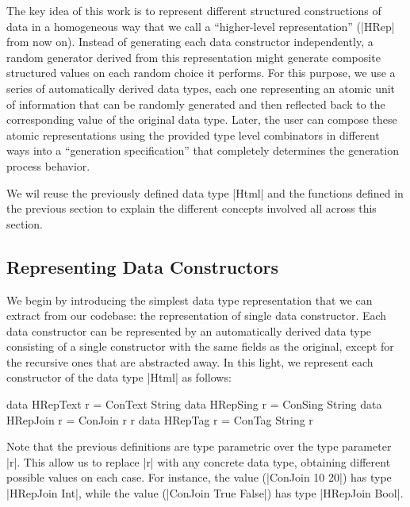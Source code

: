 The key idea of this work is to represent different structured constructions of
data in a homogeneous way that we call a ``higher-level representation'' (|HRep|
from now on).
%
Instead of generating each data constructor independently, a random generator
derived from this representation might generate composite structured values on
each random choice it performs.
%
%
For this purpose, we use a series of automatically derived data types, each one
representing an atomic unit of information that can be randomly generated and
then reflected back to the corresponding value of the original data type.
%
Later, the user can compose these atomic representations using the provided type
level combinators in different ways into a ``generation specification'' that
completely determines the generation process behavior.


We wil reuse the previously defined data type |Html| and the functions defined
in the previous section to explain the different concepts involved all across
this section.


\subsection*{\textbf{Representing Data Constructors}}

We begin by introducing the simplest data type representation that we can
extract from our codebase: the representation of single data constructor.
%
Each data constructor can be represented by an automatically derived data type
consisting of a single constructor with the same fields as the original, except
for the recursive ones that are abstracted away.
%
In this light, we represent each constructor of the data type |Html| as follows:

\begin{code}
data HRepText  r = ConText  String
data HRepSing  r = ConSing  String
data HRepJoin  r = ConJoin  r r
data HRepTag   r = ConTag   String r
\end{code}

Note that the previous definitions are type parametric over the type parameter
|r|.
%
This allow us to replace |r| with any concrete data type, obtaining different
possible values on each case.
%
For instance, the value (|ConJoin 10 20|) has type |HRepJoin Int|, while the
value (|ConJoin True False|) has type |HRepJoin Bool|.


